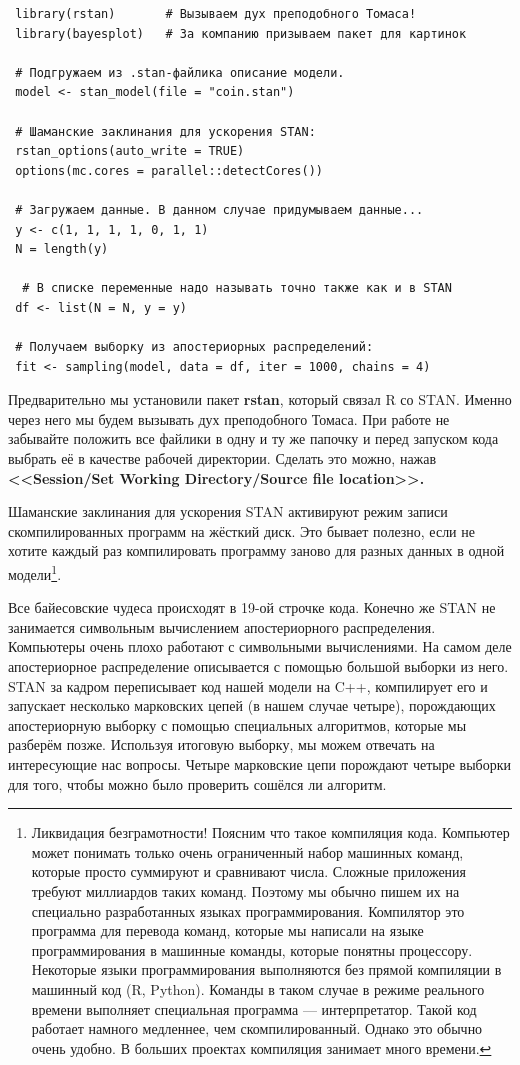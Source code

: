 \documentclass[12pt, a4paper, oneside]{extreport}
\theoremstyle{plain}              %
\theoremstyle{definition}         %
\begin{document}
  \begin{verbatim}
 library(rstan)       # Вызываем дух преподобного Томаса!
 library(bayesplot)   # За компанию призываем пакет для картинок
 
 # Подгружаем из .stan-файлика описание модели. 
 model <- stan_model(file = "coin.stan")
 
 # Шаманские заклинания для ускорения STAN:
 rstan_options(auto_write = TRUE)
 options(mc.cores = parallel::detectCores())
 
 # Загружаем данные. В данном случае придумываем данные...
 y <- c(1, 1, 1, 1, 0, 1, 1)
 N = length(y)
 
  # В списке переменные надо называть точно также как и в STAN
 df <- list(N = N, y = y)
 
 # Получаем выборку из апостериорных распределений:
 fit <- sampling(model, data = df, iter = 1000, chains = 4)
  \end{verbatim}
  
Предварительно мы установили пакет \textbf{rstan}, который связал R со STAN. Именно через него мы будем вызывать дух преподобного Томаса.  При работе не забывайте положить все файлики в одну и ту же папочку и перед запуском кода выбрать её в качестве рабочей директории. Сделать это можно, нажав  \textbf{<<Session/Set Working Directory/Source file location>>.} 
 
Шаманские заклинания для ускорения STAN активируют режим записи скомпилированных программ на жёсткий диск. Это бывает полезно, если не хотите каждый раз компилировать программу заново для разных данных в одной модели\footnote{Ликвидация безграмотности! Поясним что такое компиляция кода. Компьютер может понимать только очень ограниченный набор машинных команд, которые просто суммируют и сравнивают числа. Сложные приложения требуют миллиардов таких команд. Поэтому мы обычно пишем их на специально разработанных языках программирования. Компилятор это программа для перевода команд, которые мы написали на языке программирования в машинные команды, которые понятны процессору. Некоторые языки программирования выполняются без прямой компиляции в машинный код (R, Python). Команды в таком случае в режиме реального времени выполняет специальная программа --- интерпретатор. Такой код работает намного медленнее, чем скомпилированный. Однако это обычно очень удобно. В больших проектах компиляция занимает много времени. }.  

Все байесовские чудеса происходят в 19-ой строчке кода. Конечно же STAN не занимается символьным вычислением апостериорного распределения. Компьютеры очень плохо работают с символьными вычислениями. На самом деле апостериорное распределение описывается с помощью большой выборки из него. STAN за кадром переписывает код нашей модели на C++, компилирует его и запускает несколько марковских цепей (в нашем случае четыре), порождающих апостериорную выборку с помощью специальных алгоритмов, которые мы  разберём позже. Используя итоговую выборку, мы можем отвечать на интересующие нас вопросы. Четыре марковские цепи порождают четыре выборки для того, чтобы можно было проверить сошёлся ли алгоритм. 
\end{document}
